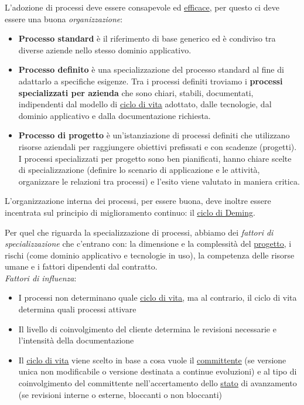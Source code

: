 		L'adozione di processi deve essere consapevole ed \underline{\hyperref[efficacia]{efficace}}, per questo ci deve essere una buona \textit{organizzazione}:
			\begin{itemize}
				\item \textbf{Processo standard} è il riferimento di base generico ed è condiviso tra diverse aziende nello stesso dominio applicativo.
				\item \textbf{Processo definito} è una specializzazione del processo standard al fine di adattarlo a specifiche esigenze. Tra i processi definiti troviamo i \textbf{processi specializzati per azienda} che sono chiari, stabili, documentati, indipendenti dal modello di \underline{\hyperref[ciclo]{ciclo di vita}} adottato, dalle tecnologie, dal dominio applicativo e dalla documentazione richiesta.
				\item \textbf{Processo di progetto} è un'istanziazione di processi definiti che utilizzano risorse aziendali per raggiungere obiettivi prefissati e con scadenze (progetti). I processi specializzati per progetto sono ben pianificati, hanno chiare scelte di specializzazione (definire lo scenario di applicazione e le attività, organizzare le relazioni tra processi) e l'esito viene valutato in maniera critica.
			\end{itemize}
		L'organizzazione interna dei processi, per essere buona, deve inoltre essere incentrata sul principio di miglioramento continuo: il \underline{\hyperref[pdca]{ciclo di Deming}}.

		Per quel che riguarda la specializzazione di processi, abbiamo dei \textit{fattori di specializzazione} che c'entrano con: la dimensione e la complessità del \underline{\hyperref[progetto]{progetto}}, i rischi (come dominio applicativo e tecnologie in uso), la competenza delle risorse umane e i fattori dipendenti dal contratto.\\
		\textit{Fattori di influenza}:
			\begin{itemize}
				\item I processi non determinano quale \underline{\hyperref[ciclo]{ciclo di vita}}, ma al contrario, il ciclo di vita determina quali processi attivare
				\item Il livello di coinvolgimento del cliente determina le revisioni necessarie e l'intensità della documentazione
				\item Il \underline{\hyperref[ciclo]{ciclo di vita}} viene scelto in base a cosa vuole il \underline{\hyperref[committente]{committente}} (se versione unica non modificabile o versione destinata a continue evoluzioni) e al tipo di coinvolgimento del committente nell'accertamento dello \underline{\hyperref[stato]{stato}} di avanzamento (se revisioni interne o esterne, bloccanti o non bloccanti)
			\end{itemize}


